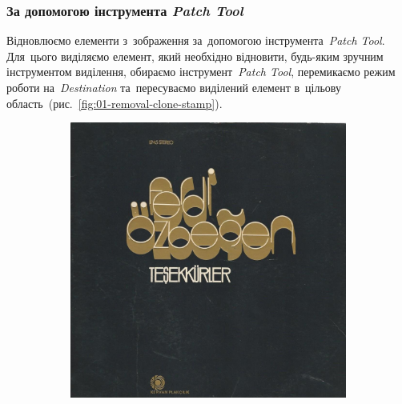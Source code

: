 \documentclass[
	a4paper,
	oneside,
	BCOR = 10mm,
	DIV = 12,
	12pt,
	headings = normal,
]{scrartcl}
\begin{document}
			\subsubsection{За допомогою інструмента \emph{\textenglish{Patch Tool}}}
				Відновлюємо елементи з~зображення за~допомогою інструмента~\emph{\textenglish{Patch Tool}}. Для~цього виділяємо елемент, який необхідно відновити, будь-яким зручним інструментом виділення, обираємо інструмент~\emph{\textenglish{Patch Tool}}, перемикаємо режим роботи на~\emph{\textenglish{Destination}} та~пересуваємо виділений елемент в~цільову область~(рис.~\ref{fig:01-removal-clone-stamp}).

				\begin{figure}[!htbp]
					\centering
					\begin{subfigure}{0.5\textwidth}
						\centering
						\includegraphics[height = 6\baselineskip]{./../01-solution/src.jpeg}
						\caption{}
						\label{subfig:04-01-src}
					\end{subfigure}%
					\begin{subfigure}{0.5\textwidth}
						\centering

\end{subfigure}
\end{figure}
\end{document}
